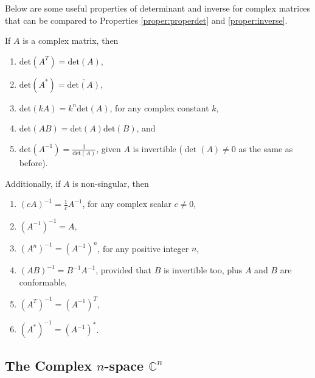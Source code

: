 Below are some useful properties of determinant and inverse for complex matrices that can be compared to Properties \ref{proper:properdet} and \ref{proper:inverse}.
\begin{proper}
If $A$ is a complex matrix, then
\begin{enumerate}
\item $\text{det}(A^T) = \text{det}(A)$,
\item $\text{det}(A^*) = \overline{\text{det}(A)}$,
\item $\text{det}(kA) = k^n \text{det}(A)$, for any complex constant $k$,
\item $\text{det}(AB) = \text{det}(A)\text{det}(B)$, and
\item $\text{det}(A^{-1}) = \frac{1}{\text{det}(A)}$, given $A$ is invertible ($\det(A) \neq 0$ as the same as before).
\end{enumerate}
Additionally, if $A$ is non-singular, then
\begin{enumerate}
\item $(cA)^{-1} = \frac{1}{c}A^{-1}$, for any complex scalar $c \neq 0$,
\item $(A^{-1})^{-1} = A$,
\item $(A^n)^{-1} = (A^{-1})^n$, for any positive integer $n$,
\item $(AB)^{-1} = B^{-1}A^{-1}$, provided that $B$ is invertible too, plus $A$ and $B$ are conformable,
\item $(A^T)^{-1} = (A^{-1})^T$,
\item $(A^*)^{-1} = (A^{-1})^*$.
\end{enumerate}
\end{proper}

\subsection{The Complex $n$-space $\mathbb{C}^n$}


